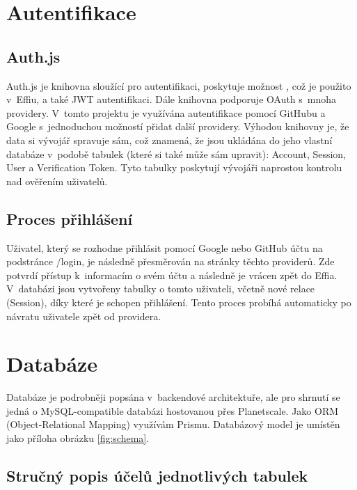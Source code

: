 \documentclass[12pt, a4paper,
openright
]{report}
\begin{document}
\section{Autentifikace}
\subsection{Auth.js}
Auth.js je knihovna sloužící pro autentifikaci, poskytuje možnost , což je použito v~Effiu, a také JWT autentifikaci. Dále knihovna podporuje OAuth s~mnoha providery. V~tomto projektu je využívána autentifikace pomocí GitHubu a Google s~jednoduchou možností přidat další providery. Výhodou knihovny je, že data si vývojář spravuje sám, což znamená, že jsou ukládána do jeho vlastní databáze v~podobě tabulek (které si také může sám upravit): Account, Session, User a Verification Token. Tyto tabulky poskytují vývojáři naprostou kontrolu nad ověřením uživatelů.
\clearpage
\subsection{Proces přihlášení}
Uživatel, který se rozhodne přihlásit pomocí Google nebo GitHub účtu na podstránce /login, je následně přesměrován na stránky těchto providerů. Zde potvrdí přístup k~informacím o svém účtu a následně je vrácen zpět do Effia. V~databázi jsou vytvořeny tabulky o tomto uživateli, včetně nové relace (Session), díky které je schopen přihlášení. Tento proces probíhá automaticky po návratu uživatele zpět od providera.

\clearpage
\section{Databáze}

Databáze je podrobněji popsána v~backendové architektuře, ale pro shrnutí se jedná o MySQL-compatible databázi hostovanou přes Planetscale. Jako ORM (Object-Relational Mapping) využívám Prismu. Databázový model je umístěn jako příloha obrázku \ref{fig:schema}.

\subsection{Stručný popis účelů jednotlivých tabulek}
\end{document}
